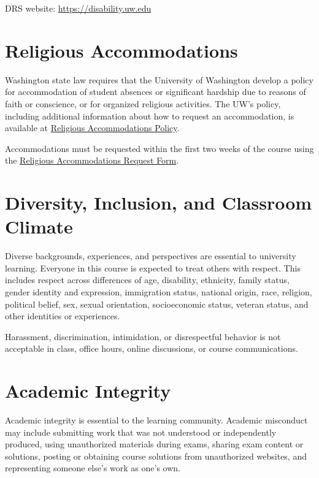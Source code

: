 \documentclass[11pt]{article}
\begin{document}
DRS website: \url{https://disability.uw.edu}

\section{Religious Accommodations}
Washington state law requires that the University of Washington develop a policy for accommodation of student absences or significant hardship due to reasons of faith or conscience, or for organized religious activities. The UW’s policy, including additional information about how to request an accommodation, is available at 
\href{https://registrar.washington.edu/staffandfaculty/religious-accommodations-policy/}{Religious Accommodations Policy}.

Accommodations must be requested within the first two weeks of the course using the 
\href{https://registrar.washington.edu/students/religious-accommodations-request/}{Religious Accommodations Request Form}.






\section{Diversity, Inclusion, and Classroom Climate}

Diverse backgrounds, experiences, and perspectives are essential to university learning. Everyone in this course is expected to treat others with respect. This includes respect across differences of age, disability, ethnicity, family status, gender identity and expression, immigration status, national origin, race, religion, political belief, sex, sexual orientation, socioeconomic status, veteran status, and other identities or experiences.

Harassment, discrimination, intimidation, or disrespectful behavior is not acceptable in class, office hours, online discussions, or course communications.

\section{Academic Integrity}

Academic integrity is essential to the learning community.  Academic misconduct may include submitting work that was not understood or independently produced, using unauthorized materials during exams, sharing exam content or solutions,  posting or obtaining course solutions from unauthorized websites,  and representing someone else's work as one's own.
\end{document}
